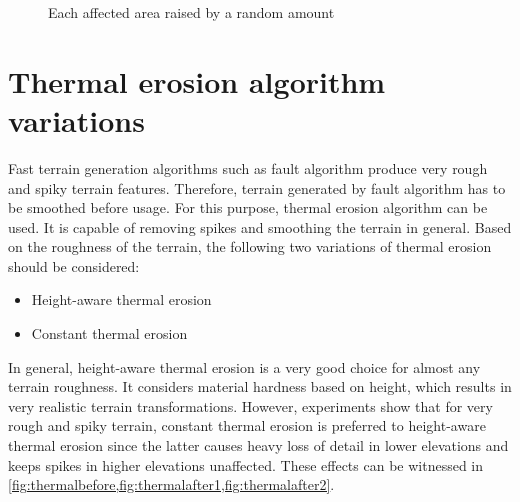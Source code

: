 \documentclass[11pt,a4paper,twoside,openright]{report}
\begin{document}
\begin{figure}[!htb]
  \caption{Each affected area raised by a random amount}\label{fig:mountainrangealteration}
\endminipage
\end{figure}

\section{Thermal erosion algorithm variations}
Fast terrain generation algorithms such as fault algorithm produce very rough and spiky terrain features. Therefore, terrain generated by fault algorithm has to be smoothed before usage. For this purpose, thermal erosion algorithm can be used. It is capable of removing spikes and smoothing the terrain in general. Based on the roughness of the terrain, the following two variations of thermal erosion should be considered:
\begin{itemize}
  \item Height-aware thermal erosion
  \item Constant thermal erosion
\end{itemize}
In general, height-aware thermal erosion is a very good choice for almost any terrain roughness. It considers material hardness based on height, which results in very realistic terrain transformations. However, experiments show that for very rough and spiky terrain, constant thermal erosion is preferred to height-aware thermal erosion since the latter causes heavy loss of detail in lower elevations and keeps spikes in higher elevations unaffected. These effects can be witnessed in \cref{fig:thermalbefore,fig:thermalafter1,fig:thermalafter2}.
\end{document}
